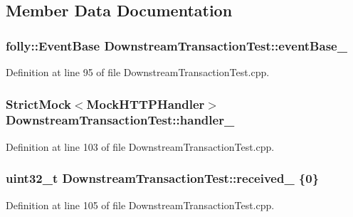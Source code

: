 \subsection{Member Data Documentation}
\subsubsection[{event\+Base\+\_\+}]{\setlength{\rightskip}{0pt plus 5cm}folly\+::\+Event\+Base Downstream\+Transaction\+Test\+::event\+Base\+\_\+\hspace{0.3cm}{\ttfamily [protected]}}\label{classDownstreamTransactionTest_a583e720341c5bc14423eedb3bd94ddc4}


Definition at line 95 of file Downstream\+Transaction\+Test.\+cpp.

\subsubsection[{handler\+\_\+}]{\setlength{\rightskip}{0pt plus 5cm}Strict\+Mock$<${\bf Mock\+H\+T\+T\+P\+Handler}$>$ Downstream\+Transaction\+Test\+::handler\+\_\+\hspace{0.3cm}{\ttfamily [protected]}}\label{classDownstreamTransactionTest_a6f6aef3fff49be0c80669d2574c3b4df}


Definition at line 103 of file Downstream\+Transaction\+Test.\+cpp.

\subsubsection[{received\+\_\+}]{\setlength{\rightskip}{0pt plus 5cm}uint32\+\_\+t Downstream\+Transaction\+Test\+::received\+\_\+ \{0\}\hspace{0.3cm}{\ttfamily [protected]}}\label{classDownstreamTransactionTest_ab91964c2c5c84ab7b28e8d713f339fa3}


Definition at line 105 of file Downstream\+Transaction\+Test.\+cpp.


